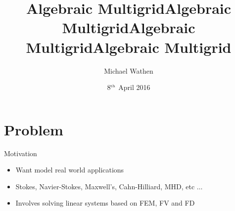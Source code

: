 \documentclass[12pt]{beamer}
\title{Algebraic Multigrid}
\author{Michael Wathen}
\institute{UBC Computer Science}
\date{8$^{\tiny{\mbox{th}}}$ April 2016}
\begin{document}
\begin{frame}

\title{Algebraic Multigrid}
\titlepage
\title{Algebraic Multigrid}

\end{frame}

\title{Algebraic Multigrid}




\section{Problem}

\begin{frame}{Motivation}
\begin{itemize}
    \item Want model real world applications
    \item Stokes, Navier-Stokes, Maxwell's, Cahn-Hilliard, MHD, etc $\ldots$
    \item Involves solving linear systems based on FEM, FV and FD
\end{itemize}

\end{frame}
\end{document}
